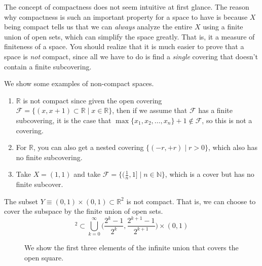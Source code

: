   The concept of compactness does not seem intuitive at first glance. The reason why compactness is such an important property for a space to have is because $X$ being compact tells us that we can \textit{always} analyze the entire $X$ using a finite union of open sets, which can simplify the space greatly. That is, it a measure of finiteness of a space. You should realize that it is much easier to prove that a space is \textit{not} compact, since all we have to do is find a \textit{single} covering that doesn't contain a finite subcovering. 

  \begin{example}
    We show some examples of non-compact spaces. 
    \begin{enumerate}
      \item $\mathbb{R}$ is not compact since given the open covering $\mathcal{F} = \{ (x, x + 1) \subset \mathbb{R} \mid x \in \mathbb{R} \}$, then if we assume that $\mathcal{F}$ has a finite subcovering, it is the case that $\max\{x_1, x _2, \ldots, x_n \} + 1 \not\in \mathcal{F}$, so this is not a covering. 
      \item For $\mathbb{R}$, you can also get a nested covering $\{(-r, +r) \mid r > 0\}$, which also has no finite subcovering. 

      \item Take $X = (1, 1)$ and take $\mathcal{F} = \{ (\frac{1}{n}, 1] \mid n \in \mathbb{N} \}$, which is a cover but has no finite subcover. 
    \end{enumerate}
  \end{example}

  \begin{example}
    The subset $Y \equiv (0,1) \times (0,1) \subset \mathbb{R}^2$ is not compact. That is, we can choose to cover the subspace by the finite union of open sets. 
    \begin{equation}
      [0,1]^2 \subset \bigcup_{k=0}^\infty \Big( \frac{2^k - 1}{2^k}, \frac{2^{k+1} - 1}{2^{k+1}} \Big) \times (0,1)
    \end{equation}

    \begin{figure}[H]
      \centering 
      \caption{We show the first three elements of the infinite union that covers the open square. }
      \label{fig:closed_square_compact}
    \end{figure}
  \end{example}


